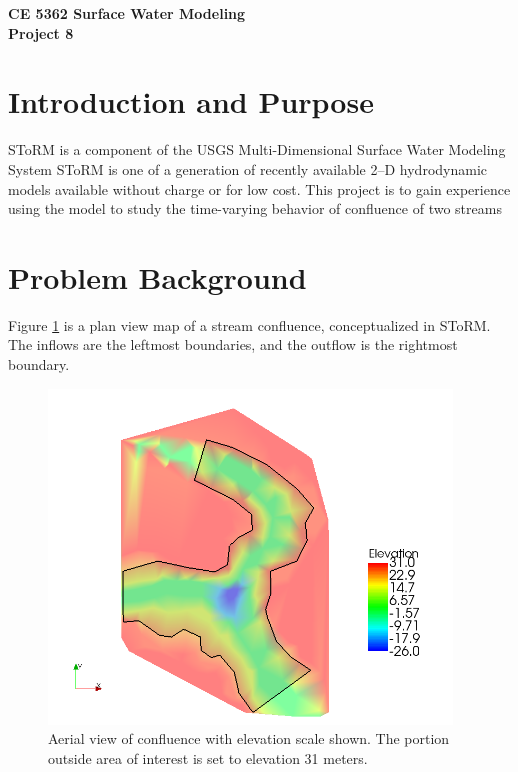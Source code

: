 \documentclass[12pt]{article}
\begin{document}
\begin{center}
{\textbf{{ CE 5362 Surface Water Modeling} \\ {Project 8}}}
\end{center}

\section*{{Introduction and Purpose}}
SToRM is a component of the USGS Multi-Dimensional Surface Water Modeling System \citep{mdswms2012}
SToRM is one of a generation of recently available 2--D hydrodynamic models available without charge or for low cost. 
This project is to gain experience using the model to study the time-varying behavior of confluence of two streams 

\section*{{Problem Background}}
Figure \ref{fig:OrdinaryBasin} is a plan view map of a stream confluence, conceptualized in SToRM.  The inflows are the leftmost boundaries, and the outflow is the rightmost boundary.


\begin{figure}[h!] %
   \centering
   \includegraphics[height=3.5in]{OrdinaryBasin.png} 
   \caption{Aerial view of confluence with elevation scale shown. The portion outside area of interest is set to elevation 31 meters.}
   \label{fig:OrdinaryBasin}
\end{figure}

\end{document}
